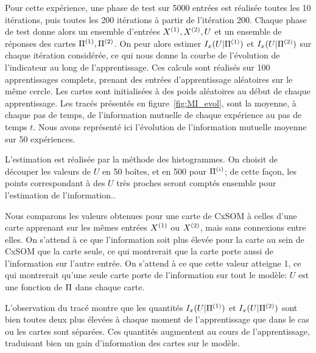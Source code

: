 Pour cette expérience, une phase de test sur 5000 entrées est réalisée toutes les 10 itérations, puis toutes les 200 itérations à partir de l'itération 200. Chaque phase de test donne alors un ensemble d'entrées $X^{({1})}, X^{({2})}, U$ et un ensemble de réponses des cartes $\Pi^{({1})}, \Pi^{({2})}$. On peur alors estimer $I_x(U|\Pi^{({1})})$ et $I_x(U|\Pi^{({2})})$ sur chaque itération considérée, ce qui nous donne la courbe de l'évolution de l'indicateur au long de l'apprentissage. 
Ces calculs sont réalisés sur 100 apprentissages complets, prenant des entrées d'apprentissage aléatoires sur le même cercle. Les cartes sont initialisées à des poids aléatoires au début de chaque apprentissage. 
Les tracés présentés en figure~\ref{fig:MI_evol}, sont la moyenne, à chaque pas de temps, de l'information mutuelle de chaque expérience au pas de temps $t$. Nous avons représenté ici l'évolution de l'information mutuelle moyenne sur 50 expériences.

L'estimation est réalisée par la méthode des histogrammes. On choisit de découper les valeurs de $U$ en 50 boîtes, et en 500 pour $\Pi^{({i})}$; de cette façon, les points correspondant à des $U$ très proches seront comptés ensemble pour l'estimation de l'information..

Nous comparons les valeurs obtenues pour une carte de CxSOM à celles d'une carte apprenant sur les mêmes entrées $X^{({1})}$ ou $X^{({2})}$, mais sans connexions entre elles. On s'attend à ce que l'information soit plus élevée pour la carte au sein de CxSOM que la carte seule, ce qui montrerait que la carte porte aussi de l'information sur l'autre entrée. On s'attend à ce que cette valeur atteigne 1, ce qui montrerait qu'une seule carte porte de l'information sur tout le modèle: $U$ est une fonction de $\Pi$ dans chaque carte.

L'observation du tracé montre que les quantités $I_x(U|\Pi^{({1})})$ et $I_x(U|\Pi^{({2})})$ sont bien toutes deux plus élevées à chaque moment de l'apprentissage que dans le cas ou les cartes sont séparées. Ces quantités augmentent au cours de l'apprentissage, traduisant bien un gain d'information des cartes sur le modèle.

